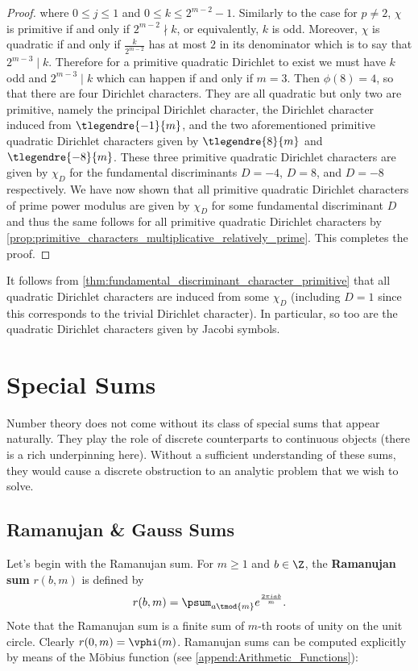 \begin{proof}
        where $0 \le j \le 1$ and $0 \le k \le 2^{m-2}-1$. Similarly to the case for $p \neq 2$, $\chi$ is primitive if and only if $2^{m-2} \nmid k$, or equivalently, $k$ is odd. Moreover, $\chi$ is quadratic if and only if $\frac{k}{2^{m-2}}$ has at most $2$ in its denominator which is to say that $2^{m-3} \mid k$. Therefore for a primitive quadratic Dirichlet to exist we must have $k$ odd and $2^{m-3} \mid k$ which can happen if and only if $m = 3$. Then $\phi(8) = 4$, so that there are four Dirichlet characters. They are all quadratic but only two are primitive, namely the principal Dirichlet character, the Dirichlet character induced from $\tlegendre{-1}{m}$, and the two aforementioned primitive quadratic Dirichlet characters given by $\tlegendre{8}{m}$ and $\tlegendre{-8}{m}$. These three primitive quadratic Dirichlet characters are given by $\chi_{D}$ for the fundamental discriminants $D = -4$, $D = 8$, and $D = -8$ respectively. We have now shown that all primitive quadratic Dirichlet characters of prime power modulus are given by $\chi_{D}$ for some fundamental discriminant $D$ and thus the same follows for all primitive quadratic Dirichlet characters by \cref{prop:primitive_characters_multiplicative_relatively_prime}. This completes the proof.
      \end{proof}

      It follows from \cref{thm:fundamental_discriminant_character_primitive} that all quadratic Dirichlet characters are induced from some $\chi_{D}$ (including $D = 1$ since this corresponds to the trivial Dirichlet character). In particular, so too are the quadratic Dirichlet characters given by Jacobi symbols.
    \section{Special Sums}
      Number theory does not come without its class of special sums that appear naturally. They play the role of discrete counterparts to continuous objects (there is a rich underpinning here). Without a sufficient understanding of these sums, they would cause a discrete obstruction to an analytic problem that we wish to solve.
      \subsection*{Ramanujan \& Gauss Sums}
        Let's begin with the Ramanujan sum. For $m \ge 1$ and $b \in \Z$, the \textbf{Ramanujan sum} $r(b,m)$ is defined by
        \[
          r(b,m) = \psum_{a \tmod{m}}e^{\frac{2\pi iab}{m}}.
        \]
        Note that the Ramanujan sum is a finite sum of $m$-th roots of unity on the unit circle. Clearly $r(0,m) = \vphi(m)$. Ramanujan sums can be computed explicitly by means of the M\"obius function (see \cref{append:Arithmetic_Functions}):

